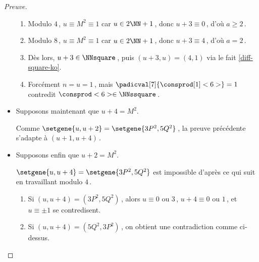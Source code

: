 \begin{proof}[Preuve]
\begin{itemize}
\begin{enumerate}
			\item Modulo $4$\,, $u \equiv M^2 \equiv 1$ car $u \in 2 \NN + 1$\,,
			donc $u + 3 \equiv 0$\,, d'où $a \geq 2$\,.

			\item Modulo $8$\,, $u \equiv M^2 \equiv 1$ car $u \in 2 \NN + 1$\,,
			donc $u + 3 \equiv 4$\,, d'où $a = 2$\,.

			\item Dès lors, $u + 3 \in \NNsquare$\,, puis $(u + 3, u) = (4, 1)$ via le fait \ref{diff-square-ko}.

			\item Forcément $n = u = 1$\,, mais $\padicval[7]{\consprod[1]<6>} = 1$ contredit $\consprod<6> \in \NNssquare$\,.
		\end{enumerate}


    	\item Supposons maintenant que $u + 4 = M^2$.

		\smallskip
		\noindent
		Comme $\setgene{u, u + 2} = \setgene{3P^2, 5Q^2}$\,, la preuve précédente s'adapte à $(u + 1, u + 4)$\,.


    	\item Supposons enfin que $u + 2 = M^2$.

		\smallskip
		\noindent
		$\setgene{u, u + 4} = \setgene{3P^2, 5Q^2}$ est impossible d'après ce qui suit en travaillant modulo $4$\,.
		\begin{enumerate}
			\item Si $(u, u + 4) = (3P^2, 5Q^2)$\,, alors 
			$u \equiv \text{$0$ ou $3$}$\,, 
			$u + 4 \equiv \text{$0$ ou $1$}$\,, et
			$u \equiv \pm 1$
			se contredisent.

			\item Si $(u, u + 4) = (5Q^2, 3P^2)$\,, on obtient une contradiction comme ci-dessus.
		\end{enumerate}
    \end{itemize}
\end{proof}

 